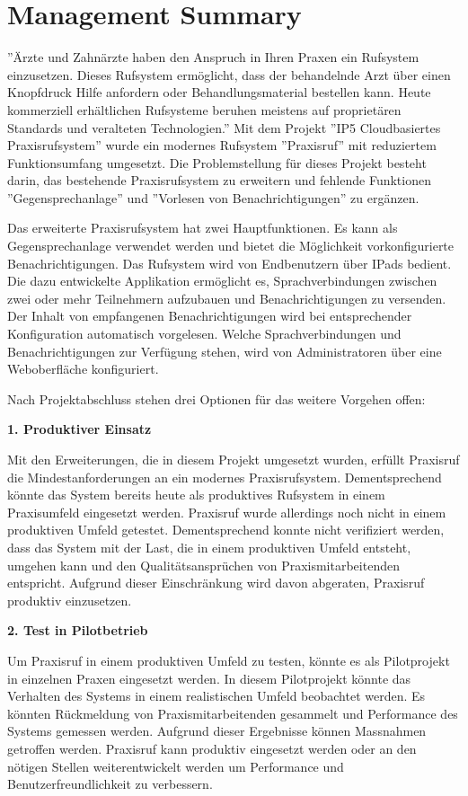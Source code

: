 \section*{Management Summary}

''Ärzte und Zahnärzte haben den Anspruch in Ihren Praxen ein Rufsystem einzusetzen.
Dieses Rufsystem ermöglicht, dass der behandelnde Arzt über einen Knopfdruck Hilfe anfordern oder Behandlungsmaterial bestellen kann.
Heute kommerziell erhältlichen Rufsysteme beruhen meistens auf proprietären Standards und veralteten Technologien.''\cite{aufgabenstellung}
Mit dem Projekt ''IP5 Cloudbasiertes Praxisrufsystem'' wurde ein modernes Rufsystem ''Praxisruf'' mit reduziertem Funktionsumfang umgesetzt.
Die Problemstellung für dieses Projekt besteht darin, das bestehende Praxisrufsystem zu erweitern und fehlende Funktionen ''Gegensprechanlage'' und ''Vorlesen von Benachrichtigungen'' zu ergänzen.

Das erweiterte Praxisrufsystem hat zwei Hauptfunktionen.
Es kann als Gegensprechanlage verwendet werden und bietet die Möglichkeit vorkonfigurierte Benachrichtigungen.
Das Rufsystem wird von Endbenutzern über IPads bedient.
Die dazu entwickelte Applikation ermöglicht es, Sprachverbindungen zwischen zwei oder mehr Teilnehmern aufzubauen und Benachrichtigungen zu versenden.
Der Inhalt von empfangenen Benachrichtigungen wird bei entsprechender Konfiguration automatisch vorgelesen.
Welche Sprachverbindungen und Benachrichtigungen zur Verfügung stehen, wird von Administratoren über eine Weboberfläche konfiguriert.

Nach Projektabschluss stehen drei Optionen für das weitere Vorgehen offen:

\textbf{1. Produktiver Einsatz}

Mit den Erweiterungen, die in diesem Projekt umgesetzt wurden, erfüllt Praxisruf die Mindestanforderungen an ein modernes Praxisrufsystem.
Dementsprechend könnte das System bereits heute als produktives Rufsystem in einem Praxisumfeld eingesetzt werden.
Praxisruf wurde allerdings noch nicht in einem produktiven Umfeld getestet.
Dementsprechend konnte nicht verifiziert werden, dass das System mit der Last, die in einem produktiven Umfeld entsteht, umgehen kann und den Qualitätsansprüchen von Praxismitarbeitenden entspricht.
Aufgrund dieser Einschränkung wird davon abgeraten, Praxisruf produktiv einzusetzen.

\textbf{2. Test in Pilotbetrieb}

Um Praxisruf in einem produktiven Umfeld zu testen, könnte es als Pilotprojekt in einzelnen Praxen eingesetzt werden.
In diesem Pilotprojekt könnte das Verhalten des Systems in einem realistischen Umfeld beobachtet werden.
Es könnten Rückmeldung von Praxismitarbeitenden gesammelt und Performance des Systems gemessen werden.
Aufgrund dieser Ergebnisse können Massnahmen getroffen werden.
Praxisruf kann produktiv eingesetzt werden oder an den nötigen Stellen weiterentwickelt werden um Performance und Benutzerfreundlichkeit zu verbessern.


